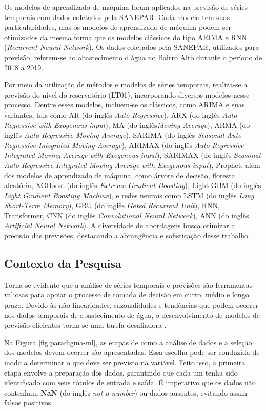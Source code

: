 Os modelos de aprendizado de máquina foram aplicados na previsão de séries temporais com dados coletados pela SANEPAR. Cada modelo tem suas particularidades, mas os modelos de aprendizado de máquina podem ser otimizados da mesma forma que os modelos clássicos do tipo ARIMA e RNN (\textit{Recurrent Neural Network}). Os dados coletados pela SANEPAR, utilizados para previsão, referem-se ao abastecimento d'água no Bairro Alto durante o período de 2018 a 2019.


Por meio da utilização de métodos e modelos de séries temporais, realiza-se a previsão do nível do reservatório (LT01), incorporando diversos modelos nesse processo. Dentre esses modelos, incluem-se os clássicos, como ARIMA e suas variantes, tais como AR (do inglês \textit{Auto-Regressive}), ARX (do inglês \textit{Auto-Regressive with Exogenous input}), MA (do inglês\textit{Moving Average}), ARMA (do inglês \textit{Auto-Regressive Moving Average}), SARIMA (do inglês \textit{Seasonal Auto-Regressive Integrated Moving Average}), ARIMAX (do inglês \textit{Auto-Regressive Integrated Moving Average with Exogenous input}), SARIMAX (do inglês \textit{Seasonal Auto-Regressive Integrated Moving Average with Exogenous input}), Prophet, além dos modelos de aprendizado de máquina, como árvore de decisão, floresta aleatória, XGBoost (do inglês \textit{Extreme Gradient Boosting}), Light GBM (do inglês \textit{Light Gradient Boosting Machine}), e redes neurais como LSTM  (do inglês \textit{Long Short-Term Memory}), GRU (do inglês \textit{Gated Recurrent Unit}), RNN, Transformer, CNN (do inglês \textit{Convolutional Neural Network}), ANN (do inglês \textit{Artificial Neural Network}). A diversidade de abordagens busca otimizar a precisão das previsões, destacando a abrangência e sofisticação desse trabalho.


\subsection{Contexto da Pesquisa} \label{subsec:contexto}

Torna-se evidente que a análise de séries temporais e previsões são ferramentas valiosas para apoiar o processo de tomada de decisão em curto, médio e longo prazo. Devido às não linearidades, sazonalidades e tendências que podem ocorrer nos dados temporais de abastecimento de água, o desenvolvimento de modelos de previsão eficientes torna-se uma tarefa desafiadora \cite{mateus}.

Na Figura \ref{fig:paradigma-ml}, as etapas de como a análise de dados e a seleção dos modelos devem ocorrer são apresentadas. Essa escolha pode ser conduzida de modo a determinar o que deve ser previsto na variável. Feito isso, a primeira etapa envolve a preparação dos dados, garantindo que cada um tenha sido identificado com seus rótulos de entrada e saída. É imperativo que os dados não contenham \textbf{NaN} (do inglês \textit{not a number}) ou dados ausentes, evitando assim falsos positivos.

